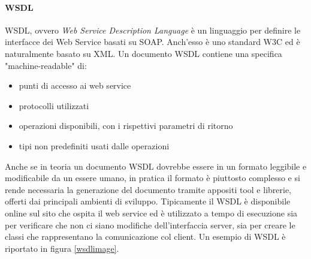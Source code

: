 \paragraph{WSDL}
WSDL, ovvero \textit{Web Service Description Language} è un linguaggio per definire le interfacce dei Web Service basati su SOAP.
Anch'esso è uno standard W3C ed è naturalmente basato su XML.
Un documento WSDL contiene una specifica "machine-readable" di:
\begin{itemize}
\item punti di accesso ai web service
\item protocolli utilizzati
\item operazioni disponibili, con i rispettivi parametri di ritorno
\item tipi non predefiniti usati dalle operazioni
\end{itemize}
Anche se in teoria un documento WSDL dovrebbe essere in un formato leggibile e modificabile da un essere umano, in pratica il formato è piuttosto complesso e si rende necessaria la generazione del documento tramite appositi tool e librerie, offerti dai principali ambienti di sviluppo.
Tipicamente il WSDL è disponibile online sul sito che ospita il web service ed è utilizzato a tempo di esecuzione sia per verificare che non ci siano modifiche dell'interfaccia server, sia per creare le classi che rappresentano la comunicazione col client.
Un esempio di WSDL è riportato in figura \ref{wsdlimage}.
